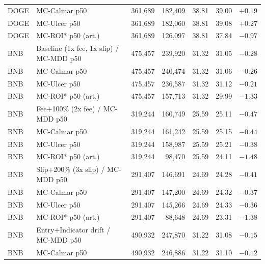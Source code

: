 \begin{table}[ht]
\begin{tabular}{llrrrrr}
DOGE & \hspace{1em}MC-Calmar p50 & 361,689 & 182,409 & 38.81 & 39.00 & $+0.19$ \\
DOGE & \hspace{1em}MC-Ulcer p50 & 361,689 & 182,060 & 38.81 & 39.08 & $+0.27$ \\
DOGE & \hspace{1em}MC-ROI* p50 (art.) & 361,689 & 126,097 & 38.81 & 37.84 & $-0.97$ \\
\midrule
BNB & Baseline (1x fee, 1x slip) / MC-MDD p50 & 475,457 & 239,920 & 31.32 & 31.05 & $-0.28$ \\
BNB & \hspace{1em}MC-Calmar p50 & 475,457 & 240,474 & 31.32 & 31.06 & $-0.26$ \\
BNB & \hspace{1em}MC-Ulcer p50 & 475,457 & 236,587 & 31.32 & 31.12 & $-0.21$ \\
BNB & \hspace{1em}MC-ROI* p50 (art.) & 475,457 & 157,713 & 31.32 & 29.99 & $-1.33$ \\
BNB & Fee+100\% (2x fee) / MC-MDD p50 & 319,244 & 160,749 & 25.59 & 25.11 & $-0.47$ \\
BNB & \hspace{1em}MC-Calmar p50 & 319,244 & 161,242 & 25.59 & 25.15 & $-0.44$ \\
BNB & \hspace{1em}MC-Ulcer p50 & 319,244 & 158,987 & 25.59 & 25.21 & $-0.38$ \\
BNB & \hspace{1em}MC-ROI* p50 (art.) & 319,244 & 98,470 & 25.59 & 24.11 & $-1.48$ \\
BNB & Slip+200\% (3x slip) / MC-MDD p50 & 291,407 & 146,691 & 24.69 & 24.28 & $-0.41$ \\
BNB & \hspace{1em}MC-Calmar p50 & 291,407 & 147,200 & 24.69 & 24.32 & $-0.37$ \\
BNB & \hspace{1em}MC-Ulcer p50 & 291,407 & 145,266 & 24.69 & 24.33 & $-0.36$ \\
BNB & \hspace{1em}MC-ROI* p50 (art.) & 291,407 & 88,648 & 24.69 & 23.31 & $-1.38$ \\
BNB & Entry+Indicator drift / MC-MDD p50 & 490,932 & 247,870 & 31.22 & 31.08 & $-0.15$ \\
BNB & \hspace{1em}MC-Calmar p50 & 490,932 & 246,886 & 31.22 & 31.10 & $-0.12$ \\

\end{tabular}
\end{table}
